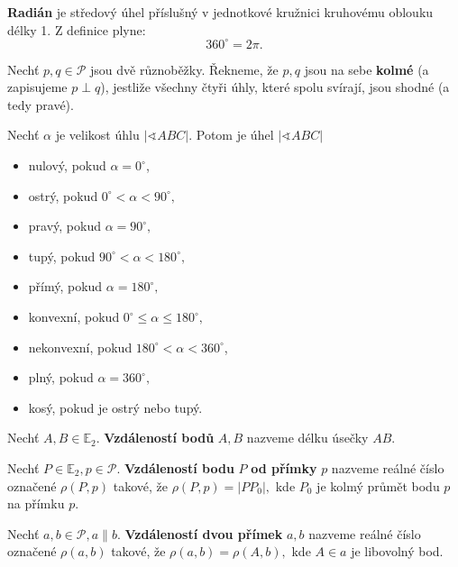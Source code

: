 \begin{pozn}
  \textbf{Radián} je středový úhel příslušný v jednotkové kružnici kruhovému oblouku délky 1. Z definice plyne:
  \[
    360^\circ = 2\pi.
  \]
\end{pozn}

\begin{definition}
  Nechť $p,q\in \mathscr P$ jsou dvě různoběžky. Řekneme, že $p,q$ jsou na sebe \textbf{kolmé} (a zapisujeme $p\perp q$), jestliže všechny čtyři úhly, které spolu svírají, jsou shodné (a tedy pravé).
\end{definition}

\begin{pozn}
  Nechť $\alpha$ je velikost úhlu $|\sphericalangle ABC|$. Potom je úhel $|\sphericalangle ABC|$
  \begin{itemize}
    \item nulový, pokud $\alpha=0^\circ$,
  \item ostrý, pokud $0^\circ <\alpha < 90^\circ,$
  \item pravý, pokud $\alpha = 90^\circ,$
  \item tupý, pokud $90^\circ < \alpha < 180^\circ,$
  \item přímý, pokud $\alpha = 180^\circ,$
  \item konvexní, pokud $0^\circ \leq \alpha \leq 180^\circ,$
  \item nekonvexní, pokud $180^\circ < \alpha < 360^\circ$,
  \item plný, pokud $\alpha = 360^\circ,$
  \item kosý, pokud je ostrý nebo tupý.
  \end{itemize}
\end{pozn}

\begin{definition}
  Nechť $A,B\in \mathbb E_2$. \textbf{Vzdáleností bodů} $A,B$ nazveme délku úsečky $AB.$
\end{definition}


\begin{definition}
  Nechť $P\in \mathbb E_2, p \in \mathscr P.$ \textbf{Vzdáleností bodu} $P$ \textbf{od přímky} $p$ nazveme reálné číslo označené $\rho(P,p)$ takové, že $\rho(P,p)=|PP_0|,$ kde $P_0$ je kolmý průmět bodu $p$ na přímku $p$.
\end{definition}

\begin{definition}
  Nechť $a,b \in \mathscr P, a \parallel b.$ \textbf{Vzdáleností dvou přímek} $a,b$ nazveme reálné číslo označené $\rho(a,b)$ takové, že $\rho(a,b)=\rho(A,b),$ kde $A\in a$ je libovolný bod.
\end{definition}

